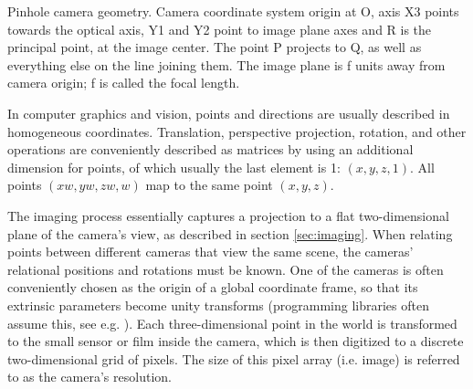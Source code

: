 
{Pinhole camera geometry. Camera coordinate system origin at O, axis X3 points towards the optical axis, Y1 and Y2 point to image plane axes and R is the principal point, at the image center. The point P projects to Q, as well as everything else on the line joining them. The image plane is f units away from camera origin; f is called the focal length.}

In computer graphics and vision, points and directions are usually described in homogeneous coordinates.
Translation, perspective projection, rotation, and other operations are conveniently described as matrices by using an additional dimension for points, of which usually the last element is 1: $(x, y, z, 1)$.
All points $(xw, yw, zw, w)$ map to the same point $(x, y, z)$.
\cite{dubrofsky2009homography,hartley03multiview}


The imaging process essentially captures a projection to a flat two-dimensional plane of the camera's view, as described in section \ref{sec:imaging}.
When relating points between different cameras that view the same scene, the cameras' relational positions and rotations must be known.
One of the cameras is often conveniently chosen as the origin of a global coordinate frame, so that its extrinsic parameters become unity transforms (programming libraries often assume this, see e.g. \cite{opencv}).
Each three-dimensional point in the world is transformed to the small sensor or film inside the camera, which is then digitized to a discrete two-dimensional grid of pixels. The size of this pixel array (i.e. image) is referred to as the camera's resolution.

